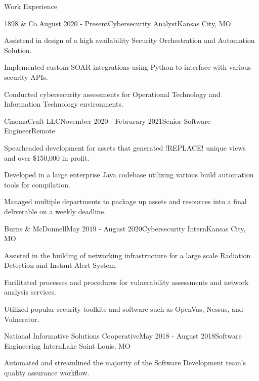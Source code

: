 \documentclass{resume}
\begin{document}
\begin{rSection}{Work Experience}
\begin{rSubsection}{1898 \& Co.}{August 2020 - Present}{Cybersecurity Analyst}{Kansas City, MO} 
    \item Assistend in design of a high availability Security Orchestration and Automation Solution.
    \item Implemented custom SOAR integrations using Python to interface with various security APIs.
    \item Conducted cybersecurity assessments for Operational Technology and Information Technology environments. 
\end{rSubsection} 
\begin{rSubsection}{CinemaCraft LLC}{November 2020 - Februrary 2021}{Senior Software Engineer}{Remote}
    \item Spearheaded development for assets that generated !REPLACE! unique views and over \$150,000 in profit. 
    \item Developed in a large enterprise Java codebase utilizing various build automation tools for compilation.
    \item Managed multiple departments to package up assets and resources into a final deliverable on a weekly deadline.
\end{rSubsection}
\begin{rSubsection}{Burns \& McDonnell}{May 2019 - August 2020}{Cybersecurity Intern}{Kansas City, MO}
    \item Assisted in the building of networking infrastructure for a large scale Radiation Detection and Instant Alert System. 
    \item Facilitated processes and procedures for vulnerability assessments and network analysis services. 
    \item Utilized popular security toolkits and software such as OpenVas, Nessus, and Vulnerator. 
\end{rSubsection}
\begin{rSubsection}{National Informative Solutions Cooperative}{May 2018 - August 2018}{Software Engineering Intern}{Lake Saint Louis, MO}
    \item Automated and streamlined the majority of the Software Development team's quality assurance workflow.  

\end{rSubsection}
\end{rSection}
\end{document}
